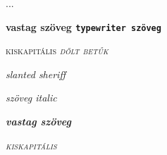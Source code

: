 \documentclass{article}
\begin{document}
...

\textbf{vastag szöveg \texttt{typewriter szöveg}}

\textsc{kiskapitális \textit{dőlt betűk}}

\textsl{slanted \textsf{sheriff}}

\emph{\textit{szöveg italic}}

\emph{\textbf{vastag szöveg}}

\emph{\textsc{kiskapitális}}
\end{document}
